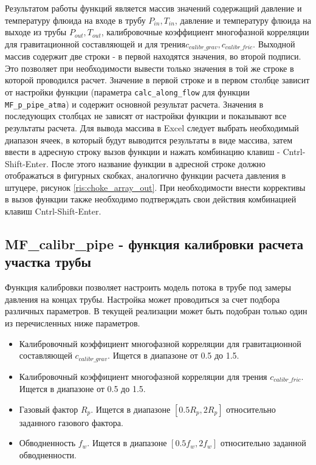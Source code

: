 Результатом работы функций является массив значений содержащий давление и температуру флюида на входе в трубу $P_{in}, T_{in}$, давление и температуру флюида на выходе из трубы $P_{out}, T_{out}$,  калибровочные коэффициент многофазной корреляции для гравитационной составляющей и для трения$c_{calibr\_grav},c_{calibr\_fric}$.  Выходной массив содержит две строки - в первой находятся значения, во второй подписи. Это позволяет при необходимости вывести только значения в той же строке в которой проводился расчет. Значение в первой строке и в первом столбце зависит от настройки функции (параметра \texttt{calc_along_flow} для функции \texttt{MF_p_pipe_atma}) и содержит основной результат расчета. Значения в последующих столбцах не зависят от настройки функции и показывают все результаты расчета.
Для вывода массива в Excel следует выбрать необходимый диапазон ячеек, в который будут выводится результаты в виде массива, затем ввести в адресную строку вызов функции и нажать комбинацию клавиш - Cntrl-Shift-Enter. После этого название функции в адресной строке должно отображаться в фигурных скобках, аналогично функции расчета давления в штуцере, рисунок \ref{ris:choke_array_out}. При необходимости внести коррективы в вызов функции также необходимо подтверждать свои действия комбинацией клавиш Cntrl-Shift-Enter.


\subsection{MF\_calibr\_pipe - функция калибровки расчета участка трубы}

Функция калибровки позволяет настроить модель потока в трубе под замеры давления на концах трубы. Настройка может проводиться за счет подбора различных параметров. В текущей реализации может быть подобран только один из перечисленных ниже параметров.
\begin{itemize}
	\item Калибровочный коэффициент многофазной корреляции для гравитационной составляющей  $c_{calibr\_grav}$. Ищется в диапазоне от 0.5 до 1.5.
	\item Калибровочный коэффициент многофазной корреляции для трения $c_{calibr\_fric}$. Ищется в диапазоне от 0.5 до 1.5.
	\item Газовый фактор $R_p$. Ищется в диапазоне $[0.5 R_p, 2 R_p]$ относительно заданного газового фактора. 
	\item Обводненность $f_w$.  Ищется в диапазоне $[0.5 f_w, 2 f_w]$ относительно заданной обводненности. 
\end{itemize}

